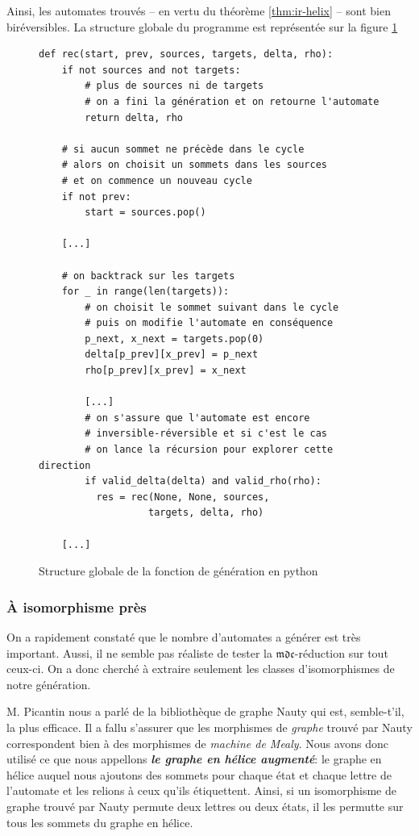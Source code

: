 \documentclass[11pt,a4paper]{article}
\begin{document}
Ainsi, les automates trouvés -- en vertu du théorème \ref{thm:ir-helix} -- sont bien biréversibles. La structure globale du programme est représentée sur la figure \ref{fig:gen-pseudo-code}

\begin{figure}
\begin{verbatim}
def rec(start, prev, sources, targets, delta, rho):
    if not sources and not targets:
        # plus de sources ni de targets
        # on a fini la génération et on retourne l'automate
        return delta, rho

    # si aucun sommet ne précède dans le cycle
    # alors on choisit un sommets dans les sources
    # et on commence un nouveau cycle
    if not prev:
        start = sources.pop()

    [...]

    # on backtrack sur les targets
    for _ in range(len(targets)):
        # on choisit le sommet suivant dans le cycle
        # puis on modifie l'automate en conséquence
        p_next, x_next = targets.pop(0)
        delta[p_prev][x_prev] = p_next
        rho[p_prev][x_prev] = x_next

        [...]
        # on s'assure que l'automate est encore
        # inversible-réversible et si c'est le cas
        # on lance la récursion pour explorer cette direction
        if valid_delta(delta) and valid_rho(rho):
          res = rec(None, None, sources,
                   targets, delta, rho)

    [...]

\end{verbatim}
  \caption{Structure globale de la fonction de génération en python\label{fig:gen-pseudo-code}}
\end{figure}

\subsubsection*{À isomorphisme près}

On a rapidement constaté que le nombre d'automates a générer est très important. Aussi, il ne semble pas réaliste de tester la $\mathfrak{mdc}$-réduction sur tout ceux-ci. On a donc cherché à extraire seulement les classes d'isomorphismes de notre génération.

M. Picantin nous a parlé de la bibliothèque de graphe \textrm{Nauty}\cite{Nauty} qui est, semble-t'il, la plus efficace. Il a fallu s'assurer que les morphismes de \textit{graphe} trouvé par \textrm{Nauty} correspondent bien à des morphismes de \textit{machine de Mealy}. Nous avons donc utilisé ce que nous appellons \textit{\textbf{le graphe en hélice augmenté}}: le graphe en hélice auquel nous ajoutons des sommets pour chaque état et chaque lettre de l'automate et les relions à ceux qu'ils étiquettent. Ainsi, si un isomorphisme de graphe trouvé par Nauty permute deux lettres ou deux états, il les permutte sur tous les sommets du graphe en hélice.
\end{document}
